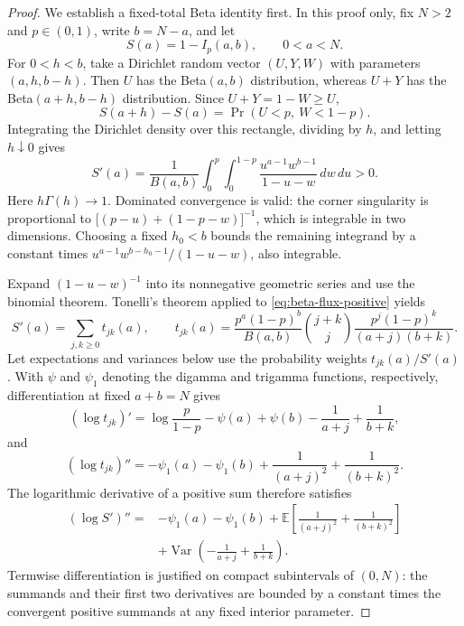 \documentclass[11pt]{article}
\begin{document}
\begin{proof}
We establish a fixed-total Beta identity first. In this proof only, fix
$N>2$ and $p\in(0,1)$, write $b=N-a$, and let
\begin{equation*}
S(a)=1-I_p(a,b),\qquad 0<a<N.
\end{equation*}
For $0<h<b$, take a Dirichlet random vector $(U,Y,W)$ with parameters
$(a,h,b-h)$. Then $U$ has the Beta$(a,b)$ distribution, whereas $U+Y$
has the Beta$(a+h,b-h)$ distribution. Since $U+Y=1-W\ge U$,
\begin{equation*}
S(a+h)-S(a)=\Pr(U<p,\ W<1-p).
\end{equation*}
Integrating the Dirichlet density over this rectangle, dividing by $h$,
and letting $h\downarrow0$ gives
\begin{equation}\label{eq:beta-flux-positive}
S'(a)=\frac1{B(a,b)}
\int_0^p\int_0^{1-p}
\frac{u^{a-1}w^{b-1}}{1-u-w}\,dw\,du>0.
\end{equation}
Here $h\Gamma(h)\to1$. Dominated convergence is valid: the corner
singularity is proportional to
$\bigl[(p-u)+(1-p-w)\bigr]^{-1}$, which is integrable in two dimensions.
Choosing a fixed $h_0<b$ bounds the remaining integrand by a constant
times $u^{a-1}w^{b-h_0-1}/(1-u-w)$, also integrable.

Expand $(1-u-w)^{-1}$ into its nonnegative geometric series and use the
binomial theorem. Tonelli's theorem applied to
\eqref{eq:beta-flux-positive} yields
\begin{equation}\label{eq:beta-flux-series}
S'(a)=\sum_{j,k\ge0}t_{jk}(a),\qquad
 t_{jk}(a)=
\frac{p^a(1-p)^b}{B(a,b)}
\binom{j+k}{j}\frac{p^j(1-p)^k}{(a+j)(b+k)}.
\end{equation}
Let expectations and variances below use the probability weights
$t_{jk}(a)/S'(a)$. With $\psi$ and $\psi_1$ denoting the digamma and
trigamma functions, respectively, differentiation at fixed $a+b=N$
gives
\begin{equation*}
(\log t_{jk})'
=\log\frac p{1-p}-\psi(a)+\psi(b)
-\frac1{a+j}+\frac1{b+k},
\end{equation*}
and
\begin{equation*}
(\log t_{jk})''
=-\psi_1(a)-\psi_1(b)+\frac1{(a+j)^2}+\frac1{(b+k)^2}.
\end{equation*}
The logarithmic derivative of a positive sum therefore satisfies
\begin{align*}
(\log S')''
={}&-\psi_1(a)-\psi_1(b)
+\mathbb E\!\left[\frac1{(a+j)^2}+\frac1{(b+k)^2}\right]\\
&+\operatorname{Var}\!\left(-\frac1{a+j}+\frac1{b+k}\right).
\end{align*}
Termwise differentiation is justified on compact subintervals of
$(0,N)$: the summands and their first two derivatives are bounded by
a constant times the convergent positive summands at any fixed
interior parameter.


\end{proof}
\end{document}
